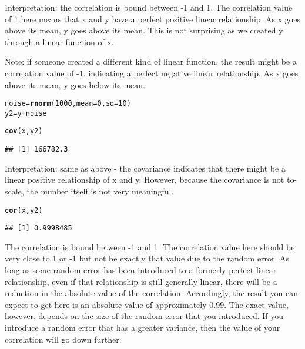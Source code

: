 \documentclass[12pt,letter]{article}\usepackage[]{graphicx}\usepackage[]{color}
\makeatletter
\newcommand{\hlnum}[1]{\textcolor[rgb]{0.686,0.059,0.569}{#1}}%
\newcommand{\hlopt}[1]{\textcolor[rgb]{0,0,0}{#1}}%
\newcommand{\hlstd}[1]{\textcolor[rgb]{0.345,0.345,0.345}{#1}}%
\newcommand{\hlkwb}[1]{\textcolor[rgb]{0.69,0.353,0.396}{#1}}%
\newcommand{\hlkwc}[1]{\textcolor[rgb]{0.333,0.667,0.333}{#1}}%
\newcommand{\hlkwd}[1]{\textcolor[rgb]{0.737,0.353,0.396}{\textbf{#1}}}%
\newenvironment{kframe}{%
 \def\at@end@of@kframe{}%
 \ifinner\ifhmode%
  \def\at@end@of@kframe{\end{minipage}}%
  \begin{minipage}{\columnwidth}%
 \fi\fi%
 \def\FrameCommand##1{\hskip\@totalleftmargin \hskip-\fboxsep
 \colorbox{shadecolor}{##1}\hskip-\fboxsep
     \hskip-\linewidth \hskip-\@totalleftmargin \hskip\columnwidth}%
 \MakeFramed {\advance\hsize-\width
   \@totalleftmargin\z@ \linewidth\hsize
   \@setminipage}}%
 {\par\unskip\endMakeFramed%
 \at@end@of@kframe}
\newenvironment{knitrout}{}{} %
\makeatother
\begin{document}
Interpretation: the correlation is bound between -1 and 1. The correlation value of 1 here means that x and y have a perfect positive linear relationship. As x goes above its mean, y goes above its mean. This is not surprising as we created y through a linear function of x.

Note: if someone created a different kind of linear function, the result might be a correlation value of -1, indicating a perfect negative linear relationship. As x goes above its mean, y goes below its mean.

\begin{knitrout}
\color{fgcolor}\begin{kframe}
\begin{alltt}
\hlstd{noise} \hlkwb{=} \hlkwd{rnorm}\hlstd{(}\hlnum{1000}\hlstd{,} \hlkwc{mean} \hlstd{=} \hlnum{0}\hlstd{,} \hlkwc{sd} \hlstd{=} \hlnum{10}\hlstd{)}
\hlstd{y2} \hlkwb{=} \hlstd{y} \hlopt{+} \hlstd{noise}

\hlkwd{cov}\hlstd{(x, y2)}
\end{alltt}
\begin{verbatim}
## [1] 166782.3
\end{verbatim}
\end{kframe}
\end{knitrout}

Interpretation: same as above - the covariance indicates that there might be a linear positive relationship of x and y. However, because the covariance is not to-scale, the number itself is not very meaningful.

\begin{knitrout}
\color{fgcolor}\begin{kframe}
\begin{alltt}
\hlkwd{cor}\hlstd{(x, y2)}
\end{alltt}
\begin{verbatim}
## [1] 0.9998485
\end{verbatim}
\end{kframe}
\end{knitrout}

The correlation is bound between -1 and 1. The correlation value here should be very close to 1 or -1 but not be exactly that value due to the random error. As long as some random error has been introduced to a formerly perfect linear relationship, even if that relationship is still generally linear, there will be a reduction in the absolute value of the correlation. Accordingly, the result you can expect to get here is an absolute value of approximately 0.99. The exact value, however, depends on the size of the random error that you introduced. If you introduce a random error that has a greater variance, then the value of your correlation will go down further.
\end{document}
